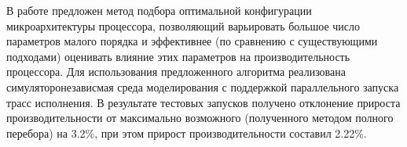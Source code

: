 В работе предложен метод подбора оптимальной конфигурации микроархитектуры процессора, позволяющий варьировать большое число параметров малого порядка и эффективнее (по сравнению с существующими подходами) оценивать влияние этих параметров на производительность процессора. Для использования предложенного алгоритма реализована симуляторонезависмая среда моделирования с поддержкой параллельного запуска трасс исполнения. В результате тестовых запусков получено отклонение прироста производительности от максимально возможного (полученного методом полного перебора) на 3.2\%, при этом прирост производительности составил 2.22\%.
